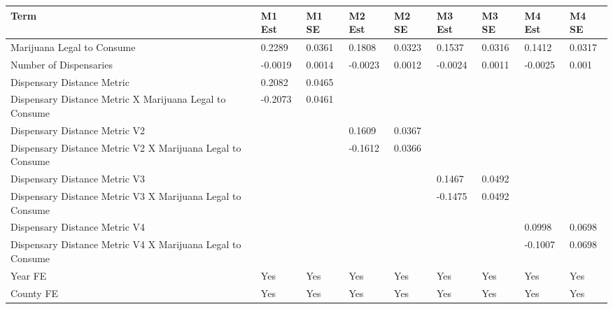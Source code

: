 \begin{tabular}{lllllllll}
  \hline
Term & M1 Est & M1 SE & M2 Est & M2 SE & M3 Est & M3 SE & M4 Est & M4 SE \\ 
  \hline
Marijuana Legal to Consume & 0.2289 & 0.0361 & 0.1808 & 0.0323 & 0.1537 & 0.0316 & 0.1412 & 0.0317 \\ 
  Number of Dispensaries & -0.0019 & 0.0014 & -0.0023 & 0.0012 & -0.0024 & 0.0011 & -0.0025 & 0.001 \\ 
  Dispensary Distance Metric & 0.2082 & 0.0465 &  &  &  &  &  &  \\ 
  Dispensary Distance Metric X Marijuana Legal to Consume & -0.2073 & 0.0461 &  &  &  &  &  &  \\ 
  Dispensary Distance Metric V2 &  &  & 0.1609 & 0.0367 &  &  &  &  \\ 
  Dispensary Distance Metric V2 X Marijuana Legal to Consume &  &  & -0.1612 & 0.0366 &  &  &  &  \\ 
  Dispensary Distance Metric V3 &  &  &  &  & 0.1467 & 0.0492 &  &  \\ 
  Dispensary Distance Metric V3 X Marijuana Legal to Consume &  &  &  &  & -0.1475 & 0.0492 &  &  \\ 
  Dispensary Distance Metric V4 &  &  &  &  &  &  & 0.0998 & 0.0698 \\ 
  Dispensary Distance Metric V4 X Marijuana Legal to Consume &  &  &  &  &  &  & -0.1007 & 0.0698 \\ 
  Year FE & Yes & Yes & Yes & Yes & Yes & Yes & Yes & Yes \\ 
  County FE & Yes & Yes & Yes & Yes & Yes & Yes & Yes & Yes \\ 
   \hline
\end{tabular}
